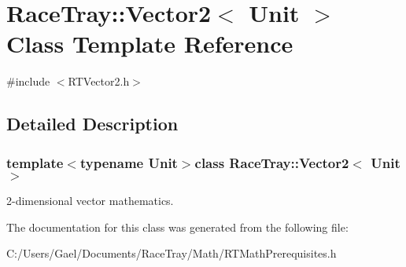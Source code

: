 \hypertarget{class_race_tray_1_1_vector2}{\section{Race\-Tray\-:\-:Vector2$<$ Unit $>$ Class Template Reference}
\label{class_race_tray_1_1_vector2}
}


{\ttfamily \#include $<$R\-T\-Vector2.\-h$>$}



\subsection{Detailed Description}
\subsubsection*{template$<$typename Unit$>$class Race\-Tray\-::\-Vector2$<$ Unit $>$}

2-\/dimensional vector mathematics. 

The documentation for this class was generated from the following file\-:\begin{DoxyCompactItemize}
\item 
C\-:/\-Users/\-Gael/\-Documents/\-Race\-Tray/\-Math/R\-T\-Math\-Prerequisites.\-h\end{DoxyCompactItemize}
